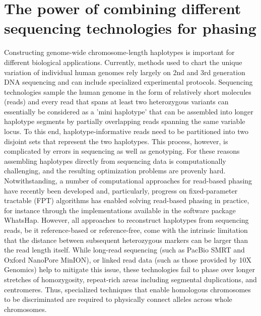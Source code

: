 \section{The power of combining different sequencing technologies for phasing}
Constructing genome-wide chromosome-length haplotypes is important for different biological applications.
Currently, methods used to chart the unique variation of individual human genomes rely largely on 2nd and 3rd generation DNA sequencing and can include specialized experimental protocols. 
Sequencing technologies sample the human genome in the form of relatively short molecules (reads) and every read that spans at least two heterozygous variants 
can essentially be considered as a 'mini haplotype' that can be assembled into longer haplotype segments by partially overlapping reads spanning the same variable locus. 
To this end, haplotype-informative reads need to be partitioned into two disjoint sets that represent the two haplotypes. 
This process, however, is complicated by errors in sequencing as well as genotyping. 
For these reasons assembling haplotypes directly from sequencing data is computationally challenging, and the resulting optimization problems are provenly hard. 
Notwithstanding, a number of computational approaches for read-based phasing have recently been developed 
and, particularly, progress on fixed-parameter tractable (FPT) algorithms has enabled solving read-based phasing in practice, for instance through the implementations available in the software package WhatsHap. 
However, all approaches to reconstruct haplotypes from sequencing reads, be it reference-based or reference-free, come with the intrinsic limitation that the distance between subsequent heterozygous markers can be larger than the read length itself. 
While long-read sequencing (such as PacBio SMRT and Oxford NanoPore MinION), or linked read data (such as those provided by 10X Genomics) help to mitigate this issue, 
these technologies fail to phase over longer stretches of homozygosity, repeat-rich areas including segmental duplications, and centromeres. 
Thus, specialized techniques that enable homologous chromosomes to be discriminated are required to physically connect alleles across whole chromosomes. 

